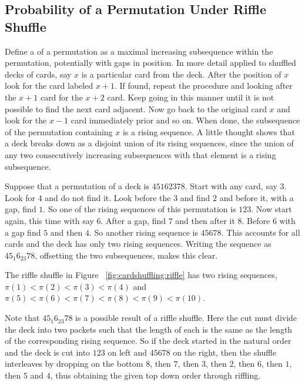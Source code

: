 \documentclass[12pt]{article}
\begin{document}
\subsection*{Probability of a Permutation Under Riffle Shuffle}

Define a %
of a permutation as a maximal increasing subsequence within the
permutation, potentially with gaps in position.  In more detail applied
to shuffled decks of cards, say \( x \) is a particular card from the
deck.  After the position of \( x \) look for the card labeled \( x+1 \).
If found, repeat the procedure and looking after the \( x+1 \) card for
the \( x+2 \) card.  Keep going in this manner until it is not possible
to find the next card adjacent.  Now go back to the original card \( x \)
and look for the \( x-1 \) card immediately prior and so on.  When done,
the subsequence of the permutation containing \( x \) is a rising
sequence.  A little thought shows that a deck breaks down as a disjoint
union of its rising sequences, since the union of any two consecutively
increasing subsequences with that element is a rising subsequence.

\begin{example}
    Suppose that a permutation of a deck is \( 45162378 \).  Start with
    any card, say \( 3 \).  Look for \( 4 \) and do not find it.  Look
    before the \( 3 \) and find \( 2 \) and before it, with a gap, find \(
    1 \).  So one of the rising sequences of this permutation is \( 123 \).
    Now start again, this time with say \( 6 \).  After a gap, find \( 7
    \) and then after it \( 8 \).  Before \( 6 \) with a gap find \( 5 \)
    and then \( 4 \).  So another rising sequence is \( 45678 \).  This
    accounts for all cards and the deck has only two rising sequences.
    Writing the sequence as \( 45_{1}6_{23}78 \), offsetting the two
    subsequences, makes this clear.
\end{example}

\begin{example}
    The riffle shuffle in Figure~%
    \ref{fig:cardshuffling:riffle} has two rising sequences, \( \pi(1) <
    \pi(2) < \pi(3) < \pi(4) \) and \( \pi(5) < \pi(6) < \pi(7) < \pi(8)
    < \pi(9) < \pi(10) \).
\end{example}

\begin{example}
    Note that \( 45_{1}6_{23}78 \) is a possible result of a riffle
    shuffle.  Here the cut must divide the deck into two packets such
    that the length of each is the same as the length of the
    corresponding rising sequence.  So if the deck started in the
    natural order and the deck is cut into \( 123 \) on left and \(
    45678 \) on the right, then the shuffle interleaves by dropping on
    the bottom \( 8 \), then \( 7 \), then \( 3 \), then \( 2 \), then \(
    6 \), then \( 1 \), then \( 5 \) and \( 4 \), thus obtaining the
    given top down order through riffling.
\end{example}
\end{document}
